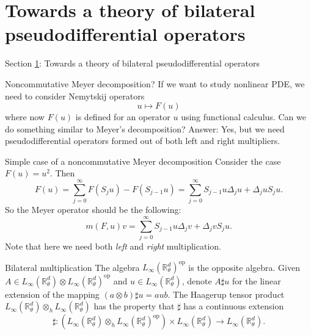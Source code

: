 \documentclass{beamer}
\numberwithin{equation}{section}
\theoremstyle{plain}
\theoremstyle{plain}
\theoremstyle{definition}
\theoremstyle{plain}
\theoremstyle{plain}
\theoremstyle{definition}
\newcommand{\Rl}{\mathbb{R}}
\newcommand{\dmult}{\sharp}
\newcommand{\op}{\mathrm{op}}
\begin{document}
\section{Towards a theory of bilateral pseudodifferential operators}\label{towards_section}

\begin{frame}
    \Huge{Section \ref{towards_section}: Towards a theory of bilateral pseudodifferential operators}
\end{frame}

\begin{frame}{Noncommutative Meyer decomposition?}
    If we want to study nonlinear PDE, we need to consider Nemytskij operators
    \[
        u\mapsto F(u)
    \]
    where now $F(u)$ is defined for an operator $u$ using functional calculus. Can we do something similar to Meyer's decomposition?
    \pause
    Answer: Yes, but we need pseudodifferential operators formed out of both left and right multipliers.
\end{frame}

\begin{frame}{Simple case of a noncommutative Meyer decomposition}
    Consider the case $F(u) = u^2.$ Then
    \[
        F(u) = \sum_{j=0}^\infty F(S_{j}u)-F(S_{j-1}u) = \sum_{j=0}^\infty S_{j-1}u \Delta_j u + \Delta_j u S_j u.
    \]
    So the Meyer operator should be the following:
    \[
        m(F,u)v = \sum_{j=0}^\infty S_{j-1}u\Delta_j v+\Delta_j v S_{j}u.
    \]
    Note that here we need both \emph{left} and \emph{right} multiplication.
\end{frame}

\begin{frame}{Bilateral multiplication}
The algebra $L_\infty(\Rl^d_\theta)^\op$ is the opposite algebra. Given $A \in L_\infty(\Rl^d_\theta)\otimes L_\infty(\Rl^d_\theta)^{\mathrm{op}}$
and $u \in L_\infty(\Rl^d_\theta)$, denote $A\dmult u$ for the linear extension of the mapping $(a\otimes b)\dmult u = aub$.
The Haagerup tensor product $L_\infty(\Rl^d_\theta)\otimes_h L_\infty(\Rl^d_\theta)$ has the property that $\dmult$ has a continuous extension
\[
    \dmult:(L_{\infty}(\Rl^d_\theta)\otimes_{h} L_{\infty}(\Rl^d_\theta)^{\op})\times L_{\infty}(\Rl^d_\theta)\to L_{\infty}(\Rl^d_\theta).
\]
\end{frame}
\end{document}
